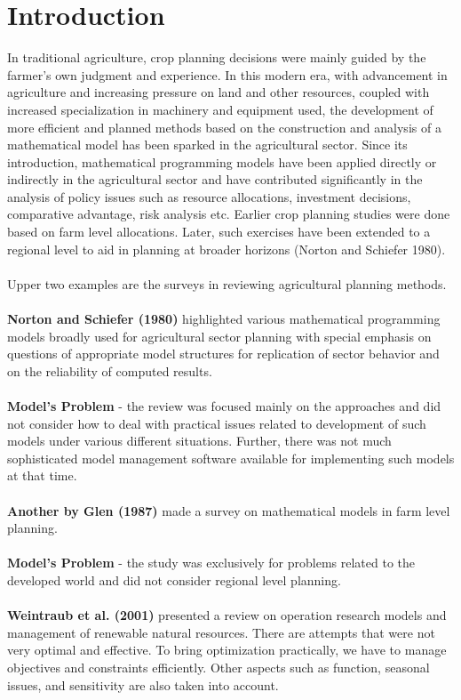 \documentclass[conference]{IEEEtran}
\begin{document}
\section{Introduction}
In traditional agriculture, crop planning decisions were mainly guided by the farmer's own judgment and experience. In this modern era, with advancement in agriculture and increasing pressure on land and other resources, coupled with increased specialization in machinery and equipment used, the development of more efficient and planned methods based on the construction and analysis of a mathematical model has been sparked in the agricultural sector. Since its introduction, mathematical programming models have been applied directly or indirectly in the agricultural sector and have contributed significantly in the analysis of policy issues such as resource allocations, investment decisions, comparative advantage, risk analysis etc. Earlier crop planning studies were done based on farm level allocations. Later, such exercises have been extended to a regional level to aid in planning at broader horizons (Norton and Schiefer 1980).
\\\\
Upper two examples are the surveys in reviewing agricultural planning methods.
\\\\
\textbf{Norton and Schiefer (1980)} highlighted various mathematical programming models broadly used for agricultural sector planning with special emphasis on questions of appropriate model structures for replication of sector behavior and on the reliability of computed results.
\\\\
\textbf{Model’s Problem} - the review was focused mainly on the approaches and did not consider how to deal with practical issues related to development of such models under various different situations. Further, there was not much sophisticated model management software available for implementing such models at that time.
\\\\
\textbf{Another by Glen (1987)} made a survey on mathematical models in farm level planning. 
\\\\
\textbf{Model’s Problem} - the study was exclusively for problems related to the developed world and did not consider regional level planning.
\\\\
\textbf{Weintraub et al. (2001)} presented a review on operation research models and management of renewable natural resources. There are attempts that were not very optimal and effective. To bring optimization practically, we have to manage objectives and constraints efficiently. Other aspects such as function, seasonal issues, and sensitivity are also taken into account. 
\end{document}
